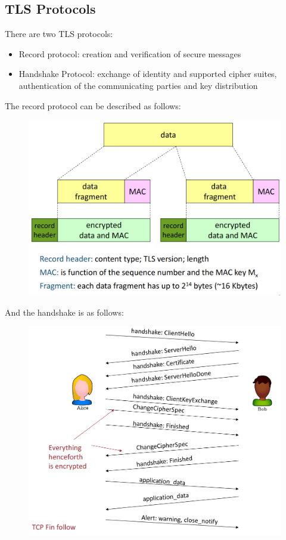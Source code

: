 \documentclass[10pt,a4paper]{report}
\begin{document}
\subsection{TLS Protocols}
There are two TLS protocols:
\begin{itemize}
\item Record protocol: creation and verification of secure messages
\item Handshake Protocol: exchange of identity and supported cipher suites, authentication of the communicating parties and key distribution
\end{itemize}
The record protocol can be described as follows:
\begin{figure}[H]
\centering
\includegraphics[scale=0.40]{21.png}
\end{figure}
And the handshake is as follows:
\begin{figure}[H]
\centering
\includegraphics[scale=0.40]{22.png}
\end{figure}
\end{document}
